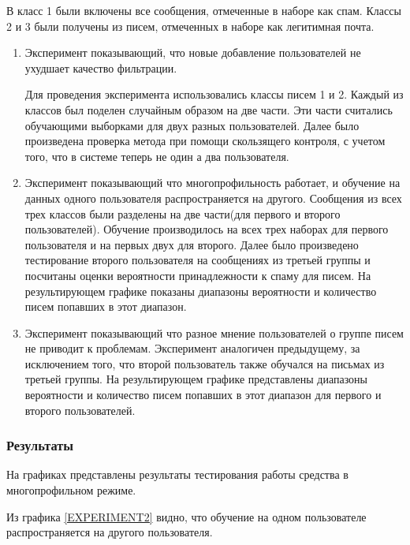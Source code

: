 В класс 1 были включены все сообщения, отмеченные в наборе \cite{SAPC} как спам. Классы 2 и 3 были получены из писем, отмеченных в наборе \cite{SAPC} как легитимная почта.
\begin{enumerate}
	\item Эксперимент показывающий, что новые добавление пользователей не ухудшает качество фильтрации.

	Для проведения эксперимента использовались классы писем 1 и 2. Каждый из классов был поделен случайным образом на две части. Эти части считались обучающими выборками для двух разных пользователей. Далее было произведена проверка метода при помощи скользящего контроля, с учетом того, что в системе теперь не один а два пользователя.

	\item Эксперимент показывающий что многопрофильность работает, и обучение на данных одного пользователя распространяется на другого. Сообщения из всех трех классов были разделены на две части(для первого и второго пользователей). Обучение производилось на всех трех наборах для первого пользователя и на первых двух для второго. Далее было произведено тестирование второго пользователя на сообщениях из третьей группы и посчитаны оценки вероятности принадлежности к спаму для писем. На результирующем графике показаны диапазоны вероятности и количество писем попавших в этот диапазон.

	\item Эксперимент показывающий что разное мнение пользователей о группе писем не приводит к проблемам. Эксперимент аналогичен предыдущему, за исключением того, что второй пользователь также обучался на письмах из третьей группы. На результирующем графике представлены диапазоны вероятности и количество писем попавших в этот диапазон для первого и второго пользователей. 
	
\end{enumerate}
\subsubsection{Результаты}
На графиках представлены результаты тестирования работы средства в многопрофильном режиме. 

Из графика \ref{EXPERIMENT2} видно, что обучение на одном пользователе распространяется на другого пользователя.

